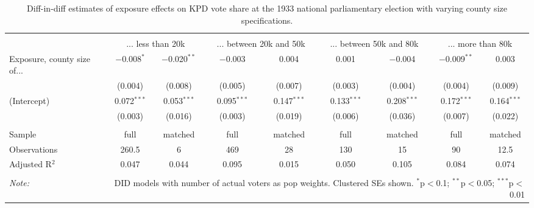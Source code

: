 
\begin{table}[!htbp] \centering 
  \caption{Diff-in-diff estimates of exposure effects on KPD vote share at the 1933 national parliamentary election with varying county size specifications.\vspace{-.25cm}} 
  \label{tab:nsdap-voteshare-kpd-countysize-dd-1933} 
\scriptsize 
\begin{tabular}{@{\extracolsep{5pt}}lcccccccc} 
\\[-1.8ex]\hline 
\hline \\[-1.8ex] 
 & \multicolumn{2}{c}{... less than 20k } & \multicolumn{2}{c}{... between 20k and 50k} & \multicolumn{2}{c}{... between 50k and 80k} & \multicolumn{2}{c}{... more than 80k} \\ 
 \cmidrule(r){2-3}\cmidrule(r){4-5}\cmidrule(r){6-7}\cmidrule(r){8-9}Exposure, county size of... & $-$0.008$^{*}$ & $-$0.020$^{**}$ & $-$0.003 & 0.004 & 0.001 & $-$0.004 & $-$0.009$^{**}$ & 0.003 \\ 
  & (0.004) & (0.008) & (0.005) & (0.007) & (0.003) & (0.004) & (0.004) & (0.009) \\ 
  (Intercept) & 0.072$^{***}$ & 0.053$^{***}$ & 0.095$^{***}$ & 0.147$^{***}$ & 0.133$^{***}$ & 0.208$^{***}$ & 0.172$^{***}$ & 0.164$^{***}$ \\ 
  & (0.003) & (0.016) & (0.003) & (0.019) & (0.006) & (0.036) & (0.007) & (0.022) \\ 
 \hline \\[-1.8ex] 
Sample & full & matched & full & matched & full & matched & full & matched \\ 
Observations & 260.5 & 6 & 469 & 28 & 130 & 15 & 90 & 12.5 \\ 
Adjusted R$^{2}$ & 0.047 & 0.044 & 0.095 & 0.015 & 0.050 & 0.105 & 0.084 & 0.074 \\ 
\hline 
\hline \\[-1.8ex] 
\textit{Note:}  & \multicolumn{8}{r}{DID models with number of actual voters as pop weights. Clustered SEs shown. $^{*}$p$<$0.1; $^{**}$p$<$0.05; $^{***}$p$<$0.01} \\ 
\end{tabular} 
\end{table} 
